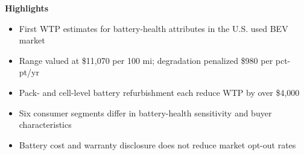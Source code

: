 \documentclass[a4paper,12pt]{article}
\begin{document}
\noindent\textbf{Highlights}

\begin{itemize}
  \item First WTP estimates for battery-health attributes in the U.S. used BEV market
  \item Range valued at \$11,070 per 100 mi; degradation penalized \$980 per pct-pt/yr
  \item Pack- and cell-level battery refurbishment each reduce WTP by over \$4,000
  \item Six consumer segments differ in battery-health sensitivity and buyer characteristics
  \item Battery cost and warranty disclosure does not reduce market opt-out rates
\end{itemize}
\end{document}
